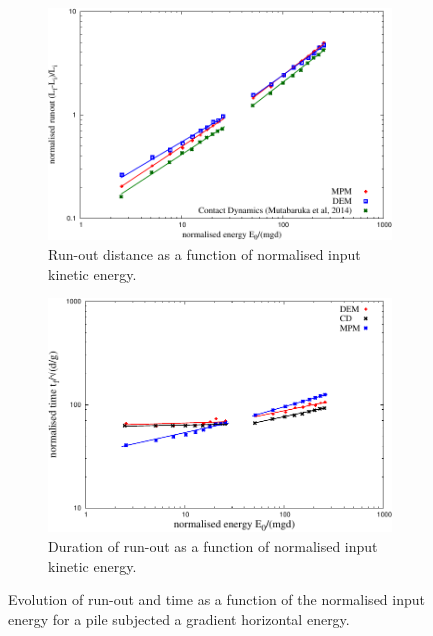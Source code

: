 \documentclass[3p,times,procedia,number]{elsarticle}
\begin{document}
\begin{figure}[tbph]
  \centering
  \begin{subfigure}[b]{0.49\textwidth}
    \centering
    \includegraphics[width=\textwidth]{figs/Runout_Eo_MPM_CD_DEM}
    \caption{Run-out distance as a function of normalised input kinetic energy.}
    \label{fig:Runout_Eo_MPM_CD_DEM}
  \end{subfigure}
  \begin{subfigure}[b]{0.49\textwidth}
    \centering
    \includegraphics[width=\textwidth]{figs/Tf_vs_Eo_Slope}
    \caption{Duration of run-out as a function of normalised input kinetic energy.}
    \label{fig:Tf_vs_Eo_Slope}
  \end{subfigure}
  \caption{Evolution of run-out and time as a function of the normalised input 
  energy for a pile subjected a gradient horizontal energy.}
  \label{fig:Slope}
\end{figure}
\end{document}
